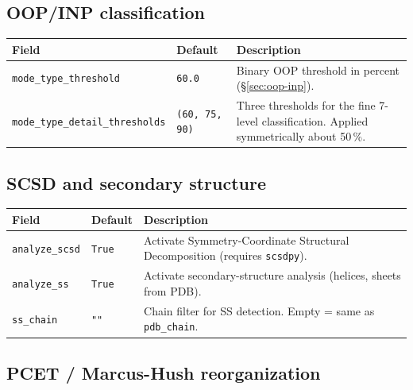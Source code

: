 \documentclass[11pt,a4paper,twoside]{article}
\theoremstyle{remark}
\begin{document}
\subsection{OOP/INP classification}

\begin{longtable}{p{} p{} p{}}
\toprule
\textbf{Field} & \textbf{Default} & \textbf{Description} \\
\midrule
\endhead
\texttt{mode\_type\_threshold} & \texttt{60.0} & Binary OOP
  threshold in percent (\S\ref{sec:oop-inp}). \\
\texttt{mode\_type\_detail\_thresholds} & \texttt{(60, 75, 90)}
  & Three thresholds for the fine 7-level classification.
  Applied symmetrically about 50\,\%. \\
\bottomrule
\end{longtable}

\subsection{SCSD and secondary structure}

\begin{longtable}{p{} p{} p{}}
\toprule
\textbf{Field} & \textbf{Default} & \textbf{Description} \\
\midrule
\endhead
\texttt{analyze\_scsd}  & \texttt{True} & Activate Symmetry-Coordinate
  Structural Decomposition (requires \texttt{scsdpy}). \\
\texttt{analyze\_ss}    & \texttt{True} & Activate secondary-structure
  analysis (helices, sheets from PDB). \\
\texttt{ss\_chain}      & \texttt{""}   & Chain filter for
  SS detection. Empty = same as \texttt{pdb\_chain}. \\
\bottomrule
\end{longtable}

\subsection{PCET / Marcus-Hush reorganization}
\end{document}
